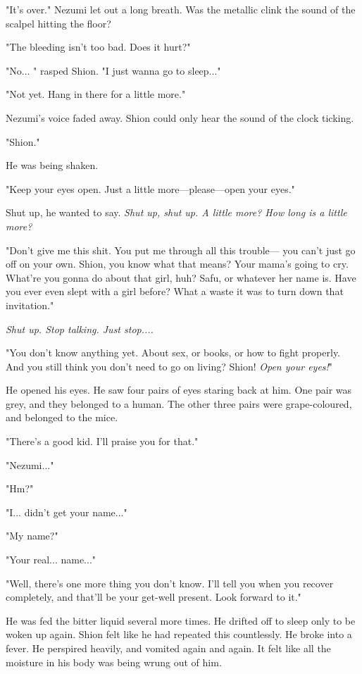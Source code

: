 "It's over." Nezumi let out a long breath. Was the metallic clink the
sound of the scalpel hitting the floor?

"The bleeding isn't too bad. Does it hurt?"

"No... " rasped Shion. "I just wanna go to sleep..."

"Not yet. Hang in there for a little more."

Nezumi's voice faded away. Shion could only hear the sound of the clock
ticking.

"Shion."

He was being shaken.

"Keep your eyes open. Just a little more---please---open your eyes."

Shut up, he wanted to say. \emph{Shut up, shut up. A little more? How long is
a little more?}

"Don't give me this shit. You put me through all this trouble--- you can't
just go off on your own. Shion, you know what that means? Your mama's
going to cry. What're you gonna do about that girl, huh? Safu, or
whatever her name is. Have you ever even slept with a girl before? What
a waste it was to turn down that invitation."

\emph{Shut up. Stop talking. Just stop....}

"You don't know anything yet. About sex, or books, or how to fight
properly. And you still think you don't need to go on living? Shion!
\emph{Open your eyes!}"

He opened his eyes. He saw four pairs of eyes staring back at him. One
pair was grey, and they belonged to a human. The other three pairs were
grape-coloured, and belonged to the mice.

"There's a good kid. I'll praise you for that."

"Nezumi..."

"Hm?"

"I... didn't get your name..."

"My name?"

"Your real... name..."

"Well, there's one more thing you don't know. I'll tell you when you
recover completely, and that'll be your get-well present. Look forward
to it."

He was fed the bitter liquid several more times. He drifted off to sleep
only to be woken up again. Shion felt like he had repeated this
countlessly. He broke into a fever. He perspired heavily, and vomited
again and again. It felt like all the moisture in his body was being
wrung out of him.

